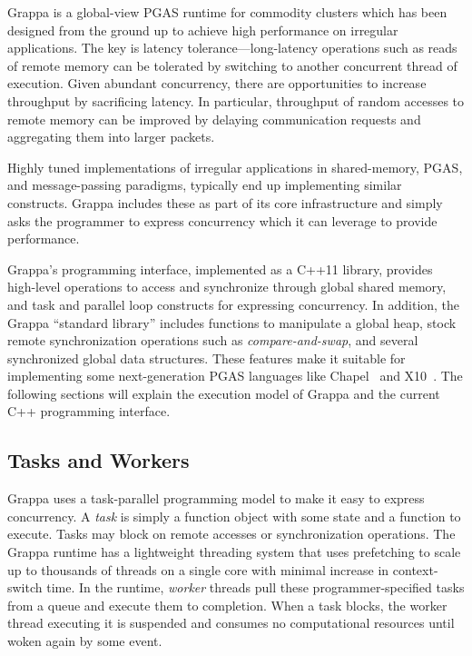 
Grappa is a global-view PGAS runtime for commodity clusters which has been designed from the ground up to achieve high performance on irregular applications. The key is latency tolerance---long-latency operations such as reads of remote memory can be tolerated by switching to another concurrent thread of execution. Given abundant concurrency, there are opportunities to increase throughput by sacrificing latency. In particular, throughput of random accesses to remote memory can be improved by delaying communication requests and aggregating them into larger packets.

Highly tuned implementations of irregular applications in shared-memory, PGAS, and message-passing paradigms, typically end up implementing similar constructs. Grappa includes these as part of its core infrastructure and simply asks the programmer to express concurrency which it can leverage to provide performance.

Grappa's programming interface, implemented as a C++11 library, provides high-level operations to access and synchronize through global shared memory, and task and parallel loop constructs for expressing concurrency. In addition, the Grappa ``standard library'' includes functions to manipulate a global heap, stock remote synchronization operations such as \emph{compare-and-swap}, and several synchronized global data structures. These features make it suitable for implementing some next-generation PGAS languages like Chapel~\cite{chapel} and X10~\cite{x10}. The following sections will explain the execution model of Grappa and the current C++ programming interface.

\subsection{Tasks and Workers}
Grappa uses a task-parallel programming model to make it easy to express concurrency.
A \emph{task} is simply a function object with some state and a function to execute.
Tasks may block on remote accesses or synchronization operations.
The Grappa runtime has a lightweight threading system that uses prefetching to scale up to thousands of threads on a single core with minimal increase in context-switch time.
In the runtime, \emph{worker} threads pull these programmer-specified tasks from a queue and execute them to completion. When a task blocks, the worker thread executing it is suspended and consumes no computational resources until woken again by some event.

